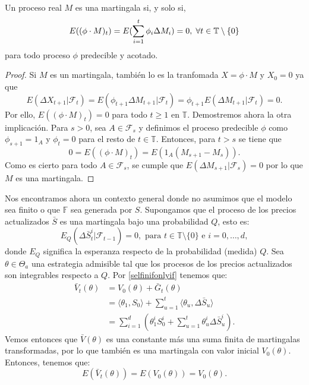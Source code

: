 \bigskip
\begin{teoremaBox}\label{2.3.5}
	Un proceso real $ M $ es una martingala si, y solo si, 
	\[
	E((\phi \cdot M)_t) = E(\sum_{i=1}^{t}\phi_i\Delta M_i) = 0, \hspace{1mm} \forall t \in \mathbb{T}\setminus\{0\}
	\]
	para todo proceso $ \phi $ predecible y acotado.
\end{teoremaBox}
\begin{proof}
	Si $ M $ es un martingala, también lo es la tranfomada $ X = \phi \cdot M $ y $ X_0 =0 $ ya que
	\[
	E(\Delta X_{t+1}|\mathcal{F}_t) = E(\phi_{t+1}\Delta M_{t+1}|\mathcal{F}_t) =  \phi_{t+1} E(\Delta M_{t+1}|\mathcal{F}_t) = 0.
	\] 
	Por ello, $ E((\phi \cdot M)_t) = 0 $ para todo $ t \geq 1 $ en $ \mathbb{T} $.
	Demostremos ahora la otra implicación. Para $ s > 0 $, sea $ A \in \mathcal{F}_s $ y definimos el proceso predecible $ \phi $ como $ \phi_{s+1} = 1_A $ y $ \phi_t = 0 $ para el resto de $ t\in \mathbb{T} $. Entonces, para $ t > s $ se tiene que
	\[
	0 = E((\phi \cdot M)_t) = E(1_A(M_{s+1}-M_s)).
	\]
	Como es cierto para todo $ A \in \mathcal{F}_s $, se cumple que $ E(\Delta M_{s+1} | \mathcal{F}_s) = 0 $ por lo que $ M $ es una martingala.
\end{proof}
\bigskip
Nos encontramos ahora un contexto general donde no asumimos que el modelo sea finito o que $ \mathbb{F} $ sea generada por $ S $. Supongamos que el proceso de los precios actualizados $ \bar{S} $ es una martingala bajo una probabilidad $ Q $, esto es:
\[
E_Q (\Delta \bar{S}^i_t | \mathcal{F}_{t-1}) = 0, \text{ para } t \in \mathbb{T}\setminus \{0\} \text{ e } i = 0,\dots,d,
\]
donde $ E_Q $ significa la esperanza respecto de la probabilidad (medida) $ Q $. Sea $ \theta \in \Theta_a $ una estrategia admisible tal que los procesos de los precios actualizados son integrables respecto a $ Q $. Por \eqref{selfinifonlyif} tenemos que:
\begin{equation*}
\begin{split}
\bar{V}_t(\theta) &= V_0(\theta) + \bar{G}_t(\theta) \\
&= \langle \theta_{1}, S_0 \rangle + \sum_{u=1}^{t} \langle \theta_{u}, \Delta \bar{S}_u \rangle \\
&= \sum_{i=1}^{d}(\theta_1^i S_0^i + \sum_{u=1}^{t} \theta_{u}^i \Delta \bar{S}_u^i).
\end{split}
\end{equation*}
Vemos entonces que $ \bar{V}(\theta) $ es una constante más una suma finita de martingalas transformadas, por lo que también es una martingala con valor inicial $ V_0 (\theta) $. Entonces, tenemos que: \[ E(\bar{V}_t (\theta)) = E(V_0 (\theta)) = V_0(\theta) .\] 
